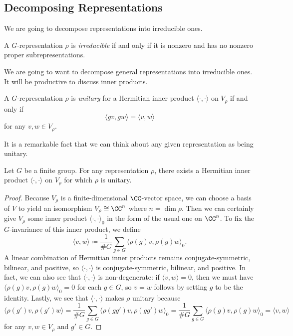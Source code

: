 \documentclass{article}
\begin{document}
\subsection{Decomposing Representations}
We are going to decompose representations into irreducible ones.
\begin{definition}[irreducible]
	A $G$-representation $\rho$ is \textit{irreducible} if and only if it is nonzero and has no nonzero proper subrepresentations.
\end{definition}
We are going to want to decompose general representations into irreducible ones. It will be productive to discuss inner products.
\begin{definition}[unitary]
	A $G$-representation $\rho$ is \textit{unitary} for a Hermitian inner product $\langle\cdot,\cdot\rangle$ on $V_\rho$ if and only if
	\[\langle gv,gw\rangle=\langle v,w\rangle\]
	for any $v,w\in V_\rho$.
\end{definition}
It is a remarkable fact that we can think about any given representation as being unitary.
\begin{proposition}[Weyl] \label{prop:make-unitary}
	Let $G$ be a finite group. For any representation $\rho$, there exists a Hermitian inner product $\langle\cdot,\cdot\rangle$ on $V_\rho$ for which $\rho$ is unitary.
\end{proposition}
\begin{proof}
	Because $V_\rho$ is a finite-dimensional $\CC$-vector space, we can choose a basis of $V$ to yield an isomorphism $V_\rho\cong\CC^n$ where $n=\dim\rho$. Then we can certainly give $V_\rho$ some inner product $\langle\cdot,\cdot\rangle_0$ in the form of the usual one on $\CC^n$. To fix the $G$-invariance of this inner product, we define
	\[\langle v,w\rangle\coloneqq\frac1{\#G}\sum_{g\in G}\langle\rho(g)v,\rho(g)w\rangle_0.\]
	A linear combination of Hermitian inner products remains conjugate-symmetric, bilinear, and positive, so $\langle\cdot,\cdot\rangle$ is conjugate-symmetric, bilinear, and positive. In fact, we can also see that $\langle\cdot,\cdot\rangle$ is non-degenerate: if $\langle v,w\rangle=0$, then we must have $\langle\rho(g)v,\rho(g)w\rangle_0=0$ for each $g\in G$, so $v=w$ follows by setting $g$ to be the identity. Lastly, we see that $\langle\cdot,\cdot\rangle$ makes $\rho$ unitary because
	\[\langle\rho(g')v,\rho(g')w\rangle=\frac1{\#G}\sum_{g\in G}\langle\rho(gg')v,\rho(gg')w\rangle_0=\frac1{\#G}\sum_{g\in G}\langle\rho(g)v,\rho(g)w\rangle_0=\langle v,w\rangle\]
	for any $v,w\in V_\rho$ and $g'\in G$.
\end{proof}
\end{document}
